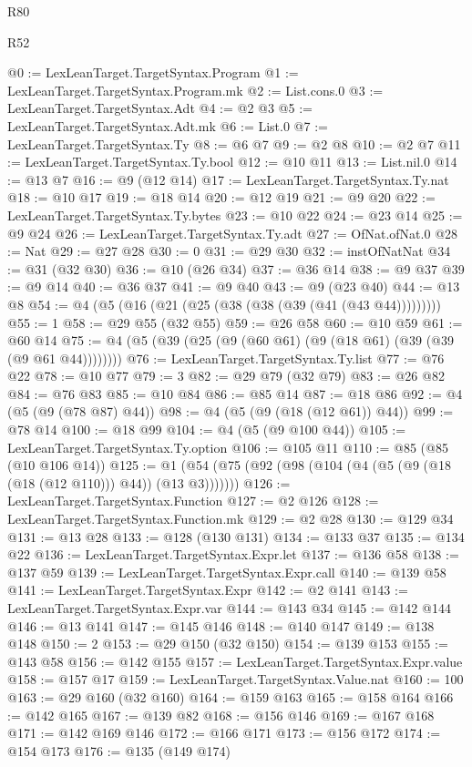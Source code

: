 \begin{lexlean}{R80}
\begin{lexlean}{R52}
\begin{coremodule}
{{{{{{{{{{{{{{{{{{{{{{{{{{{{{{{{{{{{{{{{{{{{{{{{{{{{{{{{{{{{{{{{{{{{{{{{{{{{{{{{{{{{{{{{{{{{{{{{{{{{{{{{{{{{{{{{{{{{{{{{{{{{{{{{{{{{{{{{{{{{{{{{{{{{{{{{{{{{{{{{{{{{{{{{{{{{{{{{{{{{{{{{{{{{{{{{{{{{{{@0 := LexLeanTarget.TargetSyntax.Program
@1 := LexLeanTarget.TargetSyntax.Program.mk
@2 := List.cons.{0}
@3 := LexLeanTarget.TargetSyntax.Adt
@4 := @2 @3
@5 := LexLeanTarget.TargetSyntax.Adt.mk
@6 := List.{0}
@7 := LexLeanTarget.TargetSyntax.Ty
@8 := @6 @7
@9 := @2 @8
@10 := @2 @7
@11 := LexLeanTarget.TargetSyntax.Ty.bool
@12 := @10 @11
@13 := List.nil.{0}
@14 := @13 @7
@16 := @9 (@12 @14)
@17 := LexLeanTarget.TargetSyntax.Ty.nat
@18 := @10 @17
@19 := @18 @14
@20 := @12 @19
@21 := @9 @20
@22 := LexLeanTarget.TargetSyntax.Ty.bytes
@23 := @10 @22
@24 := @23 @14
@25 := @9 @24
@26 := LexLeanTarget.TargetSyntax.Ty.adt
@27 := OfNat.ofNat.{0}
@28 := Nat
@29 := @27 @28
@30 := 0
@31 := @29 @30
@32 := instOfNatNat
@34 := @31 (@32 @30)
@36 := @10 (@26 @34)
@37 := @36 @14
@38 := @9 @37
@39 := @9 @14
@40 := @36 @37
@41 := @9 @40
@43 := @9 (@23 @40)
@44 := @13 @8
@54 := @4 (@5 (@16 (@21 (@25 (@38 (@38 (@39 (@41 (@43 @44)))))))))
@55 := 1
@58 := @29 @55 (@32 @55)
@59 := @26 @58
@60 := @10 @59
@61 := @60 @14
@75 := @4 (@5 (@39 (@25 (@9 (@60 @61) (@9 (@18 @61) (@39 (@39 (@9 @61 @44))))))))
@76 := LexLeanTarget.TargetSyntax.Ty.list
@77 := @76 @22
@78 := @10 @77
@79 := 3
@82 := @29 @79 (@32 @79)
@83 := @26 @82
@84 := @76 @83
@85 := @10 @84
@86 := @85 @14
@87 := @18 @86
@92 := @4 (@5 (@9 (@78 @87) @44))
@98 := @4 (@5 (@9 (@18 (@12 @61)) @44))
@99 := @78 @14
@100 := @18 @99
@104 := @4 (@5 (@9 @100 @44))
@105 := LexLeanTarget.TargetSyntax.Ty.option
@106 := @105 @11
@110 := @85 (@85 (@10 @106 @14))
@125 := @1 (@54 (@75 (@92 (@98 (@104 (@4 (@5 (@9 (@18 (@18 (@12 @110))) @44)) (@13 @3)))))))
@126 := LexLeanTarget.TargetSyntax.Function
@127 := @2 @126
@128 := LexLeanTarget.TargetSyntax.Function.mk
@129 := @2 @28
@130 := @129 @34
@131 := @13 @28
@133 := @128 (@130 @131)
@134 := @133 @37
@135 := @134 @22
@136 := LexLeanTarget.TargetSyntax.Expr.let
@137 := @136 @58
@138 := @137 @59
@139 := LexLeanTarget.TargetSyntax.Expr.call
@140 := @139 @58
@141 := LexLeanTarget.TargetSyntax.Expr
@142 := @2 @141
@143 := LexLeanTarget.TargetSyntax.Expr.var
@144 := @143 @34
@145 := @142 @144
@146 := @13 @141
@147 := @145 @146
@148 := @140 @147
@149 := @138 @148
@150 := 2
@153 := @29 @150 (@32 @150)
@154 := @139 @153
@155 := @143 @58
@156 := @142 @155
@157 := LexLeanTarget.TargetSyntax.Expr.value
@158 := @157 @17
@159 := LexLeanTarget.TargetSyntax.Value.nat
@160 := 100
@163 := @29 @160 (@32 @160)
@164 := @159 @163
@165 := @158 @164
@166 := @142 @165
@167 := @139 @82
@168 := @156 @146
@169 := @167 @168
@171 := @142 @169 @146
@172 := @166 @171
@173 := @156 @172
@174 := @154 @173
@176 := @135 (@149 @174)
}}}}}}}}}}}}}}}}}}}}}}}}}}}}}}}}}}}}}}}}}}}}}}}}}}}}}}}}}}}}}}}}}}}}}}}}}}}}}}}}}}}}}}}}}}}}}}}}}}}}}}}}}}}}}}}}}}}}}}}}}}}}}}}}}}}}}}}}}}}}}}}}}}}}}}}}}}}}}}}}}}}}}}}}}}}}}}}}}}}}}}}}}}}}}}}}}}}}}}
\end{coremodule}
\end{lexlean}
\end{lexlean}
